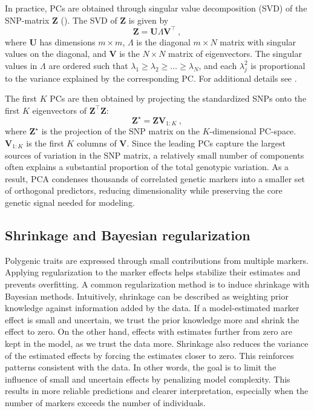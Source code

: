In practice, PCs are obtained through singular value decomposition (SVD) of the SNP-matrix $\mathbf{Z}$ (\cite{aspheim_bayesian_2024}). The SVD of $\mathbf{Z}$ is given by
%
$$
\mathbf{Z = U} \Lambda \mathbf{ V^\top} \ , 
$$
%
where $\mathbf{U}$ has dimensions $m \times m$, $\Lambda$ is the diagonal $m \times N$ matrix with singular values on the diagonal, and $\mathbf{V}$ is the $N \times N$ matrix of eigenvectors. The singular values in $\Lambda$ are ordered such that $\lambda_1 \geq \lambda_2 \geq \dots \geq \lambda_N$, and each $\lambda_j^2$ is proportional to the variance explained by the corresponding PC. For additional details see \textcite{abdi_principal_2010}.

The first $K$ PCs are then obtained by projecting the standardized SNPs onto the first $K$ eigenvectors of $\mathbf{Z^\top Z}$:
%
$$\mathbf{Z^\star = ZV}_{1:K} \ ,$$
%
where $\mathbf{Z^\star}$ is the projection of the SNP matrix on the $K$-dimensional PC-space. $\mathbf{V}_{1:K}$ is the first $K$ columns of $\mathbf{V}$. Since the leading PCs capture the largest sources of variation in the SNP matrix, a relatively small number of components often explains a substantial proportion of the total genotypic variation. As a result, PCA condenses thousands of correlated genetic markers into a smaller set of orthogonal predictors, reducing dimensionality while preserving the core genetic signal needed for modeling.

\subsection{Shrinkage and Bayesian regularization}


Polygenic traits are expressed through small contributions from multiple markers. Applying regularization to the marker effects helps stabilize their estimates and prevents overfitting. A common regularization method is to induce shrinkage with Bayesian methods. Intuitively, shrinkage can be described as weighting prior knowledge against information added by the data. If a model-estimated marker effect is small and uncertain, we trust the prior knowledge more and shrink the effect to zero. On the other hand, effects with estimates further from zero are kept in the model, as we trust the data more. 
Shrinkage also reduces the variance of the estimated effects by forcing the estimates closer to zero.
This reinforces patterns consistent with the data. In other words, the goal is to limit the influence of small and uncertain effects by penalizing model complexity. This results in more reliable predictions and clearer interpretation, especially when the number of markers exceeds the number of individuals.    

